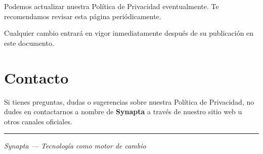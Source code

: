 \documentclass[11pt]{article}
\begin{document}
Podemos actualizar nuestra Política de Privacidad eventualmente. Te recomendamos revisar esta página periódicamente.

Cualquier cambio entrará en vigor inmediatamente después de su publicación en este documento.

\section{Contacto}

Si tienes preguntas, dudas o sugerencias sobre nuestra Política de Privacidad, no dudes en contactarnos a nombre de \textbf{Synapta} a través de nuestro sitio web u otros canales oficiales.

\vspace{1.2cm}

\begin{center}
\color{linegray}\rule{0.6\textwidth}{0.6pt}

\vspace{6pt}

\textcolor{textgray}{\textit{Synapta — Tecnología como motor de cambio}}

\end{center}
\end{document}
